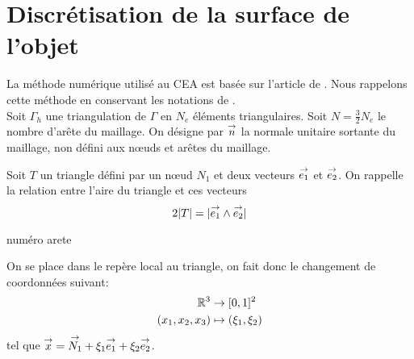 \section{Discrétisation de la surface de l'objet}

  La méthode numérique utilisé au CEA  est basée sur l'article de \cite{medgyesi-mitschang_integral_1985}. Nous rappelons cette méthode en conservant les notations de \cite{stupfel_implementation_2015}.\\

  Soit \(\Gamma_h\) une triangulation de \(\Gamma\) en \(N_e\) éléments triangulaires. Soit \(N=\frac{3}{2}N_e\) le nombre d'arête du maillage. On désigne par \(\vn\) la normale unitaire sortante du maillage, non défini aux nœuds et arêtes du maillage.

  Soit \(T\) un triangle défini par un nœud \(N_1\) et deux vecteurs \(\vect{e_1}\) et \(\vect{e_2}\). On rappelle la relation entre l'aire du triangle et ces vecteurs
  \begin{equation*}
    2|T| = |\vect{e_1}\pvect\vect{e_2}|
  \end{equation*}

  \newcommand{\ncouche}{6}
  \newcommand{\setnodes}[6]{
      \renewcommand{\xa}{#1}
      \renewcommand{\ya}{#2}
      \renewcommand{\xb}{#3}
      \renewcommand{\yb}{#4}
      \renewcommand{\xc}{#5}
      \renewcommand{\yc}{#6}
  }
  \newcommand{\xa}{0.0}
  \newcommand{\ya}{0.0}
  \newcommand{\xb}{3.0}
  \newcommand{\yb}{0.0}
  \newcommand{\xc}{0.0}
  \newcommand{\yc}{3.0}
    \begin{center}
      \begin{tikzpicture}[scale=1]
        
      \end{tikzpicture}
    \end{center}
    \label{fig:form_int:fon_base:tri}


    \begin{TODO}
    numéro arete
    \end{TODO}

   On se place dans le repère local au triangle, on fait donc le changement de coordonnées suivant:
  \begin{align*}
    \RR^3 &\rightarrow [0,1]^2 \\
    (x_1,x_2,x_3) & \mapsto (\xi_1,\xi_2)
  \end{align*}
    tel que \(\vx =\vect{N_1}+ \xi_1 \vect{e_1} + \xi_2 \vect{e_2}\).

